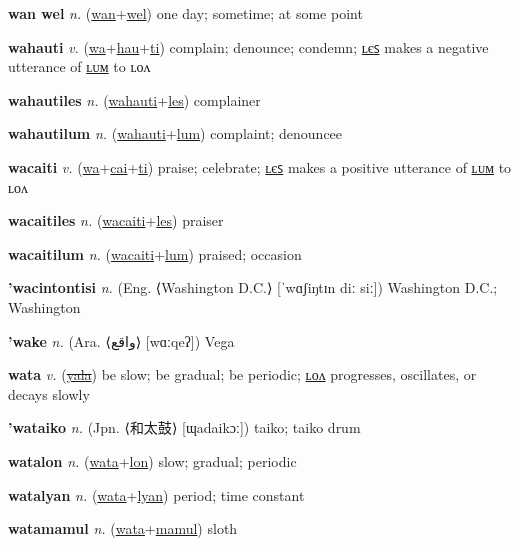 \textbf{\hypertarget{wan wel}{wan wel}} \textit{n.} (\hyperlink{wan}{wan}+\allowbreak \hyperlink{wel}{wel})
one day; sometime; at some point

\textbf{\hypertarget{wahauti}{wahauti}} \textit{v.} (\hyperlink{wa}{wa}+\allowbreak \hyperlink{hau}{hau}+\allowbreak \hyperlink{ti}{ti})
complain; denounce; condemn; \hyperlink{wahautiles}{ʟєꜱ} makes a negative utterance of \hyperlink{wahautilum}{ʟᴜᴍ} to ʟᴏᴧ

\textbf{\hypertarget{wahautiles}{wahautiles}} \textit{n.} (\hyperlink{wahauti}{wahauti}+\allowbreak \hyperlink{les}{les})
complainer

\textbf{\hypertarget{wahautilum}{wahautilum}} \textit{n.} (\hyperlink{wahauti}{wahauti}+\allowbreak \hyperlink{lum}{lum})
complaint; denouncee

\textbf{\hypertarget{wacaiti}{wacaiti}} \textit{v.} (\hyperlink{wa}{wa}+\allowbreak \hyperlink{cai}{cai}+\allowbreak \hyperlink{ti}{ti})
praise; celebrate; \hyperlink{wacaitiles}{ʟєꜱ} makes a positive utterance of \hyperlink{wacaitilum}{ʟᴜᴍ} to ʟᴏᴧ

\textbf{\hypertarget{wacaitiles}{wacaitiles}} \textit{n.} (\hyperlink{wacaiti}{wacaiti}+\allowbreak \hyperlink{les}{les})
praiser

\textbf{\hypertarget{wacaitilum}{wacaitilum}} \textit{n.} (\hyperlink{wacaiti}{wacaiti}+\allowbreak \hyperlink{lum}{lum})
praised; occasion

\textbf{\hypertarget{'wacintontisi}{'wacintontisi}} \textit{n.} (Eng. ⟨Washington D.C.⟩ [ˈwɑʃiŋtɪn diː siː])
Washington D.C.; Washington

\textbf{\hypertarget{'wake}{'wake}} \textit{n.} (Ara. ⟨{\arabics{}واقع‎}⟩ [wɑːqeʔ])
Vega

\textbf{\hypertarget{wata}{wata}} \textit{v.} (\hyperlink{yala}{\sout{yala}})
be slow; be gradual; be periodic; \hyperlink{watalon}{ʟᴏᴧ} progresses, oscillates, or decays slowly

\textbf{\hypertarget{'wataiko}{'wataiko}} \textit{n.} (Jpn. ⟨{\japanese{}和太鼓}⟩ [ɰadaikɔː])
taiko; taiko drum

\textbf{\hypertarget{watalon}{watalon}} \textit{n.} (\hyperlink{wata}{wata}+\allowbreak \hyperlink{lon}{lon})
slow; gradual; periodic

\textbf{\hypertarget{watalyan}{watalyan}} \textit{n.} (\hyperlink{wata}{wata}+\allowbreak \hyperlink{lyan}{lyan})
period; time constant

\textbf{\hypertarget{watamamul}{watamamul}} \textit{n.} (\hyperlink{wata}{wata}+\allowbreak \hyperlink{mamul}{mamul})
sloth

